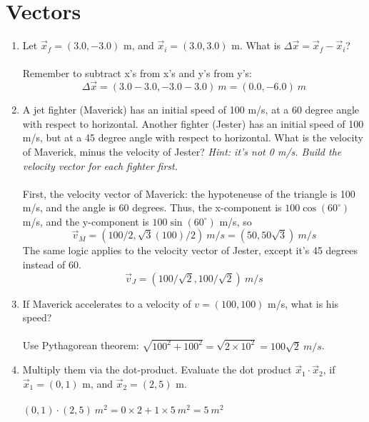\documentclass[10pt]{article}
\begin{document}
\section{Vectors}
\begin{enumerate}
\item Let $\vec{x}_f = (3.0,-3.0)$ m, and $\vec{x}_i = (3.0,3.0)$ m.  What is $\Delta \vec{x} = \vec{x}_f - \vec{x}_i$? \\ \\
Remember to subtract x's from x's and y's from y's:
\begin{equation}
\Delta \vec{x} = (3.0-3.0, -3.0 - 3.0) ~ m = (0.0,-6.0) ~ m
\end{equation}
\item A jet fighter (Maverick) has an initial speed of 100 m/s, at a 60 degree angle with respect to horizontal.  Another fighter (Jester) has an initial speed of 100 m/s, but at a 45 degree angle with respect to horizontal.  What is the velocity of Maverick, minus the velocity of Jester?  \textit{Hint: it's not 0 m/s.  Build the velocity vector for each fighter first.} \\ \\
First, the velocity vector of Maverick: the hypoteneuse of the triangle is 100 m/s, and the angle is 60 degrees.  Thus, the x-component is $100 \cos(60^{\circ})$ m/s, and the y-component is $100 \sin(60^{\circ})$ m/s, so 
\begin{equation}
\vec{v}_M = (100/2,\sqrt{3}(100)/2) ~ m/s = (50,50\sqrt{3}) ~ m/s
\end{equation}
The same logic applies to the velocity vector of Jester, except it's 45 degrees instead of 60.
\begin{equation}
\vec{v}_J = (100/\sqrt{2},100/\sqrt{2}) ~ m/s
\end{equation}
\item If Maverick accelerates to a velocity of $v = (100,100)$ m/s, what is his speed? \\ \\
Use Pythagorean theorem: $\sqrt{100^2+100^2} = \sqrt{2 \times 10^2} = 100 \sqrt{2} ~ m/s$.
\item Multiply them via the dot-product.  Evaluate the dot product $\vec{x}_1 \cdot \vec{x}_2$, if $\vec{x}_1 = (0,1)$ m, and $\vec{x}_2 = (2,5)$ m. \\ \\
$(0,1) \cdot (2,5) ~ m^2 = 0\times 2 + 1\times 5 ~ m^2 = 5 ~ m^2$
\end{enumerate}
\end{document}
